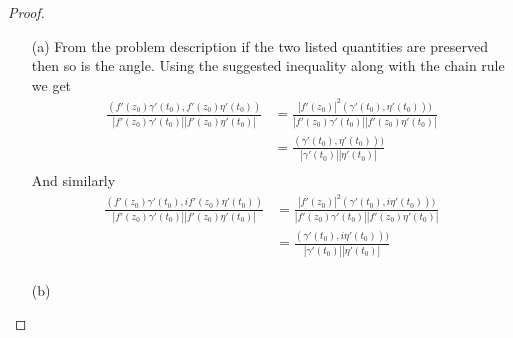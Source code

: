 \documentclass[10pt]{article}
\newcommand{\sk}{\vskip 10mm}
\theoremstyle{remark}
\theoremstyle{remark}
\begin{document}
\begin{proof}
  \begin{enumerate}
  \item[(a)] From the problem description if the two listed quantities are
    preserved then so is the angle. Using the suggested inequality along
    with the chain rule we get
    \begin{align*}
      \frac{(f'(z_0)\gamma'(t_0),f'(z_0)\eta'(t_0))}{|f'(z_0)\gamma'(t_0)||f'(z_0)\eta'(t_0)|}&=\frac{|f'(z_0)|^2(\gamma'(t_0),\eta'(t_0)))}{|f'(z_0)\gamma'(t_0)||f'(z_0)\eta'(t_0)|}\\
      &= \frac{(\gamma'(t_0),\eta'(t_0)))}{|\gamma'(t_0)||\eta'(t_0)|}\\
    \end{align*}
    And similarly
    \begin{align*}
      \frac{(f'(z_0)\gamma'(t_0),if'(z_0)\eta'(t_0))}{|f'(z_0)\gamma'(t_0)||f'(z_0)\eta'(t_0)|}&=\frac{|f'(z_0)|^2(\gamma'(t_0),i\eta'(t_0)))}{|f'(z_0)\gamma'(t_0)||f'(z_0)\eta'(t_0)|}\\
      &= \frac{(\gamma'(t_0),i\eta'(t_0)))}{|\gamma'(t_0)||\eta'(t_0)|}\\
    \end{align*}
  \item[(b)] 
  \end{enumerate}
\end{proof}

\sk

\end{document}
